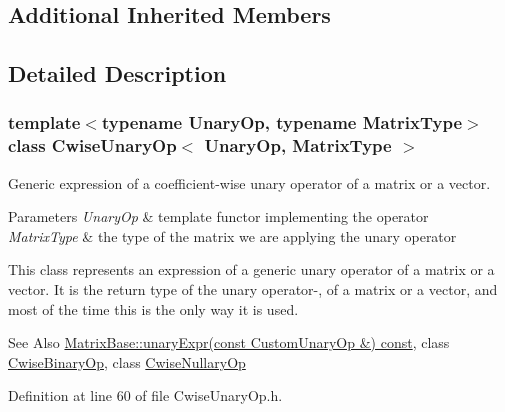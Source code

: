 \subsection*{Additional Inherited Members}


\subsection{Detailed Description}
\subsubsection*{template$<$typename Unary\-Op, typename Matrix\-Type$>$class Cwise\-Unary\-Op$<$ Unary\-Op, Matrix\-Type $>$}

Generic expression of a coefficient-\/wise unary operator of a matrix or a vector. 


\begin{DoxyParams}{Parameters}
{\em Unary\-Op} & template functor implementing the operator \\
\hline
{\em Matrix\-Type} & the type of the matrix we are applying the unary operator\\
\hline
\end{DoxyParams}
This class represents an expression of a generic unary operator of a matrix or a vector. It is the return type of the unary operator-\/, of a matrix or a vector, and most of the time this is the only way it is used.

\begin{DoxySeeAlso}{See Also}
\hyperlink{class_matrix_base_a10188fe54ffbf2b3cc4805eba39327cb}{Matrix\-Base\-::unary\-Expr(const Custom\-Unary\-Op \&) const}, class \hyperlink{class_cwise_binary_op}{Cwise\-Binary\-Op}, class \hyperlink{class_cwise_nullary_op}{Cwise\-Nullary\-Op} 
\end{DoxySeeAlso}


Definition at line 60 of file Cwise\-Unary\-Op.\-h.



